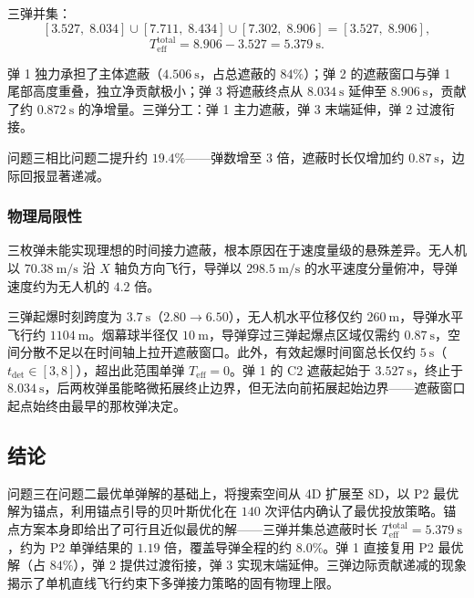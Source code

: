 \documentclass{ctexart}
\begin{document}
三弹并集：
\[
[3.527,\; 8.034] \cup [7.711,\; 8.434] \cup [7.302,\; 8.906] = [3.527,\; 8.906],
\]
\[
T_{\text{eff}}^{\text{total}} = 8.906 - 3.527 = 5.379\ \mathrm{s}.
\]

弹 1 独力承担了主体遮蔽（$4.506\ \mathrm{s}$，占总遮蔽的 $84\%$）；弹 2 的遮蔽窗口与弹 1 尾部高度重叠，独立净贡献极小；弹 3 将遮蔽终点从 $8.034\ \mathrm{s}$ 延伸至 $8.906\ \mathrm{s}$，贡献了约 $0.872\ \mathrm{s}$ 的净增量。三弹分工：弹 1 主力遮蔽，弹 3 末端延伸，弹 2 过渡衔接。

问题三相比问题二提升约 $19.4\%$——弹数增至 3 倍，遮蔽时长仅增加约 $0.87\ \mathrm{s}$，边际回报显著递减。

\subsubsection{物理局限性}

三枚弹未能实现理想的时间接力遮蔽，根本原因在于速度量级的悬殊差异。无人机以 $70.38\ \mathrm{m/s}$ 沿 $X$ 轴负方向飞行，导弹以 $298.5\ \mathrm{m/s}$ 的水平速度分量俯冲，导弹速度约为无人机的 $4.2$ 倍。

三弹起爆时刻跨度为 $3.7\ \mathrm{s}$（$2.80 \to 6.50$），无人机水平位移仅约 $260\ \mathrm{m}$，导弹水平飞行约 $1104\ \mathrm{m}$。烟幕球半径仅 $10\ \mathrm{m}$，导弹穿过三弹起爆点区域仅需约 $0.87\ \mathrm{s}$，空间分散不足以在时间轴上拉开遮蔽窗口。此外，有效起爆时间窗总长仅约 $5\ \mathrm{s}$（$t_{\text{det}} \in [3, 8]$），超出此范围单弹 $T_{\text{eff}} = 0$。弹 1 的 C2 遮蔽起始于 $3.527\ \mathrm{s}$，终止于 $8.034\ \mathrm{s}$，后两枚弹虽能略微拓展终止边界，但无法向前拓展起始边界——遮蔽窗口起点始终由最早的那枚弹决定。

\subsection{结论}

问题三在问题二最优单弹解的基础上，将搜索空间从 4D 扩展至 8D，以 P2 最优解为锚点，利用锚点引导的贝叶斯优化在 $140$ 次评估内确认了最优投放策略。锚点方案本身即给出了可行且近似最优的解——三弹并集总遮蔽时长 $T_{\text{eff}}^{\text{total}} = 5.379\ \mathrm{s}$，约为 P2 单弹结果的 $1.19$ 倍，覆盖导弹全程的约 $8.0\%$。弹 1 直接复用 P2 最优解（占 $84\%$），弹 2 提供过渡衔接，弹 3 实现末端延伸。三弹边际贡献递减的现象揭示了单机直线飞行约束下多弹接力策略的固有物理上限。
\end{document}
